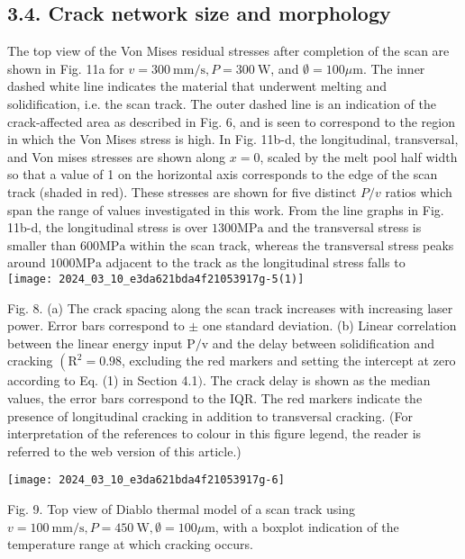 \documentclass[10pt]{article}
\begin{document}
\subsection*{3.4. Crack network size and morphology}
The top view of the Von Mises residual stresses after completion of the scan are shown in Fig. 11a for $v=300 \mathrm{~mm} / \mathrm{s}, P=300 \mathrm{~W}$, and $\emptyset=100 \mu \mathrm{m}$. The inner dashed white line indicates the material that underwent melting and solidification, i.e. the scan track. The outer dashed line is an indication of the crack-affected area as described in Fig. 6, and is seen to correspond to the region in which the Von Mises stress is high. In Fig. 11b-d, the longitudinal, transversal, and Von mises stresses are shown along $x=0$, scaled by the melt pool half width so that a value of 1 on the horizontal axis corresponds to the edge of the scan track (shaded in red). These stresses are shown for five distinct $P / v$ ratios which span the range of values investigated in this work. From the line graphs in Fig. 11b-d, the longitudinal stress is over $1300 \mathrm{MPa}$ and the transversal stress is smaller than $600 \mathrm{MPa}$ within the scan track, whereas the transversal stress peaks around $1000 \mathrm{MPa}$ adjacent to the track as the longitudinal stress falls to\\
\texttt{[image: 2024\_03\_10\_e3da621bda4f21053917g-5(1)]}

Fig. 8. (a) The crack spacing along the scan track increases with increasing laser power. Error bars correspond to $\pm$ one standard deviation. (b) Linear correlation between the linear energy input $\mathrm{P} / \mathrm{v}$ and the delay between solidification and cracking $\left(\mathrm{R}^{2}=0.98\right.$, excluding the red markers and setting the intercept at zero according to Eq. (1) in Section 4.1$)$. The crack delay is shown as the median values, the error bars correspond to the IQR. The red markers indicate the presence of longitudinal cracking in addition to transversal cracking. (For interpretation of the references to colour in this figure legend, the reader is referred to the web version of this article.)

\begin{center}
\texttt{[image: 2024\_03\_10\_e3da621bda4f21053917g-6]}
\end{center}

Fig. 9. Top view of Diablo thermal model of a scan track using $v=100 \mathrm{~mm} / \mathrm{s}, P=450 \mathrm{~W}, \emptyset=100 \mu \mathrm{m}$, with a boxplot indication of the temperature range at which cracking occurs.
\end{document}
